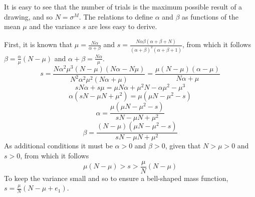 \documentclass[a4paper, headings=standardclasses]{scrartcl}
\begin{document}
It is easy to see that the number of trials is the maximum possible result of a drawing, and so $N=\sigma^M$.
The relations to define $\alpha$ and $\beta$ as functions of the mean $\mu$ and the variance $s$ are less easy to derive.

First, it is known that $\mu = \frac{N \alpha}{\alpha + \beta}$  and $s=\frac{N\alpha\beta(\alpha + \beta + N)}{(\alpha+\beta)^2(\alpha+\beta+1)}$, from which it follows $\beta = \frac{\alpha}{\mu}(N-\mu)$ and $\alpha + \beta = \frac{N \alpha}{\mu}$.
$$s=\frac{N\alpha^2\mu^3(N-\mu)(N\alpha-N\mu)}{N^2\alpha^2\mu^2(N\alpha+\mu)} = \frac{\mu(N-\mu)(\alpha-\mu)}{N\alpha+\mu}$$
$$sN\alpha + s\mu = \mu N\alpha + \mu^2 N - \alpha \mu^2 - \mu^3$$
$$\alpha(sN -\mu N + \mu^2) = \mu(\mu N - \mu^2 -s)$$
$$\alpha=\frac{\mu(\mu N - \mu^2 -s)}{sN -\mu N + \mu^2}$$
$$\beta=\frac{(N-\mu)(\mu N - \mu^2 -s)}{sN -\mu N + \mu^2}$$
As additional conditions it must be $\alpha > 0$ and $\beta>0$, given that $N>\mu>0$ and $s>0$, from which it follows
$$\mu(N-\mu) > s > \frac{\mu}{N}(N-\mu)$$
To keep the variance small and so to ensure a bell-shaped mass function, $s=\frac{\mu}{N}(N-\mu+e_1)$.
\end{document}

